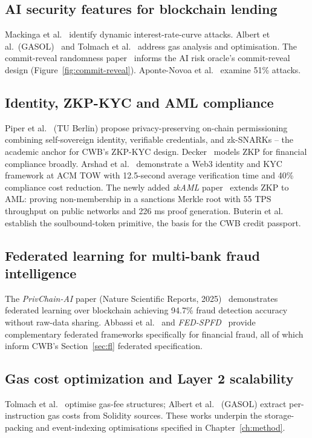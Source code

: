 \documentclass[12pt,a4paper]{report}
\begin{document}
\subsection{AI security features for blockchain lending}
Mackinga et al.~\cite{mackinga2023attacks} identify dynamic interest-rate-curve attacks. Albert et al.\ (GASOL)~\cite{albert2020gasol} and Tolmach et al.~\cite{tolmach2024gas} address gas analysis and optimisation. The commit-reveal randomness paper~\cite{commitReveal2025} informs the AI risk oracle's commit-reveal design (Figure~\ref{fig:commit-reveal}). Aponte-Novoa et al.~\cite{aponte2021fiftyOne} examine 51\% attacks.

\subsection{Identity, ZKP-KYC and AML compliance}
Piper et al.~\cite{piper2025zkkyc} (TU Berlin) propose privacy-preserving on-chain permissioning combining self-sovereign identity, verifiable credentials, and zk-SNARKs -- the academic anchor for CWB's ZKP-KYC design. Decker~\cite{decker2025zkp} models ZKP for financial compliance broadly. Arshad et al.~\cite{arshad2026web3identity} demonstrate a Web3 identity and KYC framework at ACM TOW with 12.5-second average verification time and 40\% compliance cost reduction. The newly added \emph{zkAML} paper~\cite{zkAml2025} extends ZKP to AML: proving non-membership in a sanctions Merkle root with 55 TPS throughput on public networks and 226 ms proof generation. Buterin et al.~\cite{buterin2022soulbound} establish the soulbound-token primitive, the basis for the CWB credit passport.

\subsection{Federated learning for multi-bank fraud intelligence}
The \emph{PrivChain-AI} paper (Nature Scientific Reports, 2025)~\cite{privchainAi2025} demonstrates federated learning over blockchain achieving 94.7\% fraud detection accuracy without raw-data sharing. Abbassi et al.~\cite{abbassi2025federated} and \emph{FED-SPFD}~\cite{fedSpfd2025} provide complementary federated frameworks specifically for financial fraud, all of which inform CWB's Section~\ref{sec:fl} federated specification.

\subsection{Gas cost optimization and Layer 2 scalability}
Tolmach et al.~\cite{tolmach2024gas} optimise gas-fee structures; Albert et al.~\cite{albert2020gasol} (GASOL) extract per-instruction gas costs from Solidity sources. These works underpin the storage-packing and event-indexing optimisations specified in Chapter~\ref{ch:method}.
\end{document}
